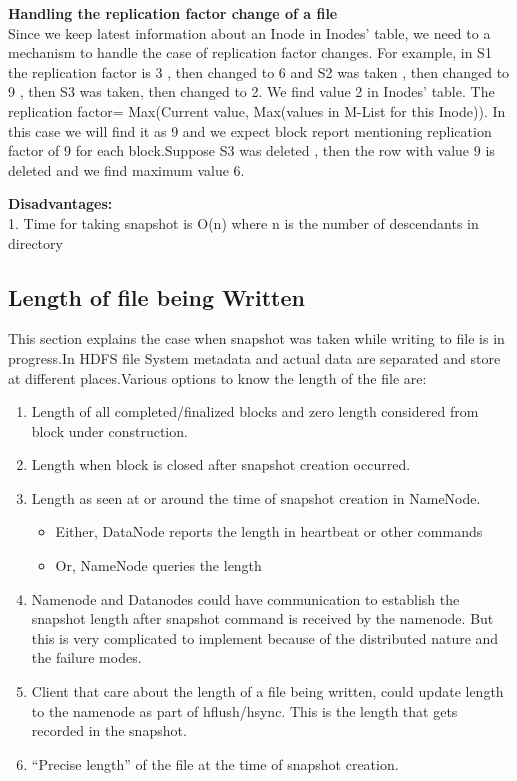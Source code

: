 \textbf{Handling the replication factor change of a file}\\
Since we keep latest information about an Inode in Inodes’ table, we need to a mechanism to handle the case of replication factor changes. For example, in S1 the replication factor is 3 , then changed to 6 and S2 was taken , then changed to 9 , then S3 was taken, then changed to 2.
We find value 2 in Inodes’ table. The replication factor= Max(Current value, Max(values in M-List for this Inode)). In this case we will find it as 9 and we expect block report mentioning replication factor of 9 for each block.Suppose S3 was deleted , then the row with value 9 is deleted and we find maximum value 6. 

\textbf{Disadvantages:}\\
1. Time for taking snapshot is O(n) where n is the number of descendants  in directory 

\subsection{Length of file being Written}
This section explains the case when snapshot was taken while writing to file is in progress.In HDFS file System metadata and actual data are separated and store at different places.Various options to know the length of the file are:
\begin{enumerate}
 \item Length of all completed/finalized blocks and zero length considered from block under
construction.
\item Length when block is closed after snapshot creation occurred.
\item Length as seen at or around the time of snapshot creation in NameNode.
\begin{itemize}
 \item Either, DataNode reports the length in heartbeat or other commands
\item  Or, NameNode queries the length
\end{itemize}

\item Namenode and Datanodes could have communication to establish the snapshot length after
snapshot command is received by the namenode. But this is very complicated to implement
because of the distributed nature and the failure modes.
\item Client that care about the length of a file being written, could update length to the namenode as part of hflush/hsync. This is the length that gets recorded in the snapshot.
\item “Precise length” of the file at the time of snapshot creation.

\end{enumerate}

